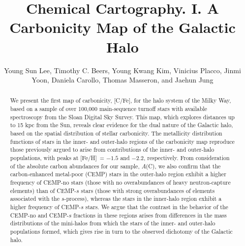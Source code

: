 \documentclass[iop]{emulateapj}
\newcommand*{\feh}{[Fe/H]}
\begin{document}
\title{Chemical Cartography. I. A Carbonicity Map of the Galactic Halo}

\author{Young Sun Lee, Timothy C. Beers, Young Kwang Kim,
        Vinicius Placco, Jinmi Yoon, Daniela Carollo,
        Thomas Masseron, and Jaehun Jung}

\begin{abstract}

We present the first map of carbonicity, [C/Fe], for the halo system of
the Milky Way, based on a sample of over 100,000 main-sequence turnoff
stars with available spectroscopy from the Sloan Digital Sky Survey.
This map, which explores distances up to 15 kpc from the Sun, reveals
clear evidence for the dual nature of the Galactic halo, based on the
spatial distribution of stellar carbonicity. The metallicity
distribution functions of stars in the inner- and outer-halo regions of
the carbonicity map reproduce those previously argued to arise from
contributions of the inner- and outer-halo populations, with peaks at
\feh\ = $-1.5$ and $-2.2$, respectively. From consideration of the
absolute carbon abundances for our sample, $A$(C), we also confirm that
the carbon-enhanced metal-poor (CEMP) stars in the outer-halo region
exhibit a higher frequency of CEMP-no stars (those with no
overabundances of heavy neutron-capture elements) than of CEMP-$s$ 
stars (those with strong overabundances of elements associated
with the $s$-process), whereas the stars in the inner-halo region
exhibit a higher frequency of CEMP-$s$ stars. We argue that the contrast
in the behavior of the CEMP-no and CEMP-$s$ fractions in these regions
arises from differences in the mass distributions of the mini-halos from
which the stars of the inner- and outer-halo populations formed, which
gives rise in turn to the observed dichotomy of the Galactic halo.

\end{abstract}
\end{document}
